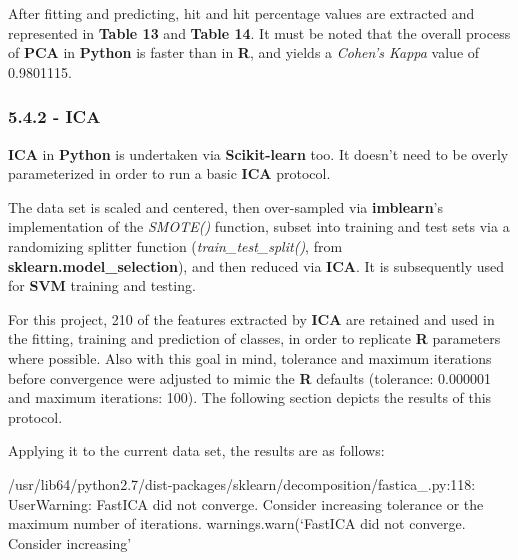 \documentclass[]{article}
\begin{document}
After fitting and predicting, hit and hit percentage values are
extracted and represented in \textbf{Table 13} and \textbf{Table 14}. It
must be noted that the overall process of \textbf{PCA} in
\textbf{Python} is faster than in \textbf{R}, and yields a \emph{Cohen's
Kappa} value of 0.9801115.

\subsubsection{5.4.2 - ICA}\label{ica-2}

\textbf{ICA} in \textbf{Python} is undertaken via \textbf{Scikit-learn}
too. It doesn't need to be overly parameterized in order to run a basic
\textbf{ICA} protocol.

The data set is scaled and centered, then over-sampled via
\textbf{imblearn}'s implementation of the \emph{SMOTE()} function,
subset into training and test sets via a randomizing splitter function
(\emph{train\_test\_split()}, from \textbf{sklearn.model\_selection}),
and then reduced via \textbf{ICA}. It is subsequently used for
\textbf{SVM} training and testing.

For this project, 210 of the features extracted by \textbf{ICA} are
retained and used in the fitting, training and prediction of classes, in
order to replicate \textbf{R} parameters where possible. Also with this
goal in mind, tolerance and maximum iterations before convergence were
adjusted to mimic the \textbf{R} defaults (tolerance: 0.000001 and
maximum iterations: 100). The following section depicts the results of
this protocol.

Applying it to the current data set, the results are as follows:

/usr/lib64/python2.7/dist-packages/sklearn/decomposition/fastica\_.py:118:
UserWarning: FastICA did not converge. Consider increasing tolerance or
the maximum number of iterations. warnings.warn(`FastICA did not
converge. Consider increasing'
\end{document}
